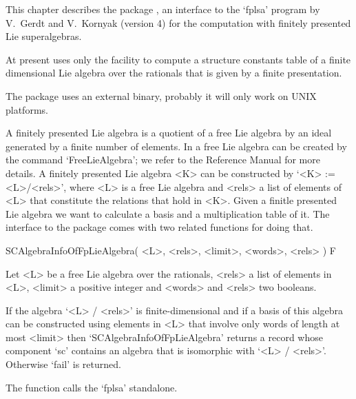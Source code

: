

This chapter describes the {\GAP} package {\FPLSA} ,
an interface to the `fplsa' program by V.~Gerdt and V.~Kornyak (version 4)
for the computation with finitely presented Lie superalgebras.

At present {\GAP} uses only the facility to compute a structure constants
table of a finite dimensional Lie algebra over the rationals
that is given by a finite presentation.

The package uses an external binary,
probably it will only work on UNIX platforms. 



A finitely presented Lie algebra is a quotient of a free Lie algebra
by an ideal generated by a finite number of elements.
In {\GAP} a free Lie algebra can be created by the command `FreeLieAlgebra';
we refer to the {\GAP} Reference Manual for more details.
A finitely presented Lie algebra
<K> can be constructed by `<K> := <L>/<rels>', where <L> is a free Lie algebra
and <rels> a list of elements of <L> that constitute the relations 
that hold in <K>. Given a finitle presented Lie algebra we want to calculate 
a basis and a multiplication table of it. The interface to the {\FPLSA} 
package comes with two related functions for doing that. 

\>SCAlgebraInfoOfFpLieAlgebra( <L>, <rels>, <limit>, <words>, <rels> ) F

Let <L> be a free Lie algebra over the rationals,
<rels> a list of elements in <L>,
<limit> a positive integer 
and <words> and <rels> two booleans.

If the algebra `<L> / <rels>' is finite-dimensional and if a basis of
this algebra can be constructed using elements in <L> that involve only
words of length at most <limit> then `SCAlgebraInfoOfFpLieAlgebra'
returns a record whose component `sc' contains an algebra that is
isomorphic with `<L> / <rels>'.
Otherwise `fail' is returned.

The function calls the `fplsa' standalone.

